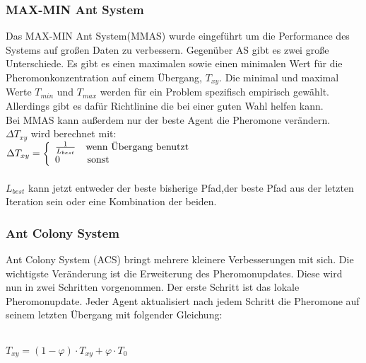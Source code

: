 \subsubsection{MAX-MIN Ant System}
Das MAX-MIN Ant System(MMAS) wurde eingeführt um die Performance des Systems auf großen Daten zu verbessern. Gegenüber AS gibt es zwei große Unterschiede. Es gibt es einen maximalen sowie einen minimalen Wert für die Pheromonkonzentration auf einem Übergang, $T_{xy}$. Die minimal und maximal Werte $T_{min}$ und $T_{max}$ werden für ein Problem spezifisch empirisch gewählt\cite{socha2002max}. Allerdings gibt es dafür Richtlinine die bei einer guten Wahl helfen kann\cite{STUTZLE2000889}.\\
Bei MMAS kann außerdem nur der beste Agent die Pheromone verändern.\\
$\Delta T_{xy}$ wird berechnet mit:\\
\large
$\Delta T_{xy}  = \left\{
  \begin{array}{ll}
  \frac{1}{L_{best}} & \normalsize\textrm{wenn Übergang benutzt} \\
  0 & \, \normalsize \textrm{sonst} \\
  \end{array}
  \right. $
  \normalsize\\\\
$L_{best}$ kann jetzt entweder der beste bisherige Pfad,der beste Pfad aus der letzten Iteration sein oder eine Kombination der beiden.\\
\subsubsection{Ant Colony System }
Ant Colony System (ACS) bringt mehrere kleinere Verbesserungen mit sich. Die wichtigste Veränderung ist die Erweiterung des Pheromonupdates. Diese wird nun in zwei Schritten vorgenommen. Der erste Schritt ist das lokale Pheromonupdate. Jeder Agent aktualisiert nach jedem Schritt die Pheromone auf seinem letzten Übergang mit folgender Gleichung:\\\\

\begin{large}
  $T_{xy}=(1-\varphi)\cdot T_{xy}+\varphi\cdot T_0$\\
\end{large}

